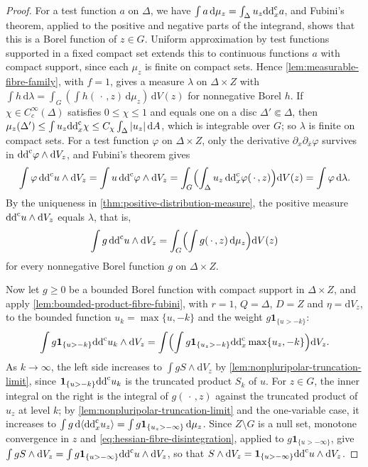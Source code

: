 \begin{proof}
For a test function $a$ on $\Delta$, we have $\int a\,\mathrm d\mu_z=\int_\Delta u_z\mathrm{dd}^{\mathrm{c}}_xa$, and Fubini's theorem, applied to the positive and negative parts of the integrand, shows that this is a Borel function of $z\in G$. Uniform approximation by test functions supported in a fixed compact set extends this to continuous functions $a$ with compact support, since each $\mu_z$ is finite on compact sets. Hence \cref{lem:measurable-fibre-family}, with $f=1$, gives a measure $\lambda$ on $\Delta\times Z$ with $\int h\,\mathrm d\lambda=\int_G(\int h(\,\cdot\,,z)\,\mathrm d\mu_z)\,\mathrm dV(z)$ for nonnegative Borel $h$. If $\chi\in C_c^\infty(\Delta)$ satisfies $0\leq\chi\leq1$ and equals one on a disc $\Delta'\Subset\Delta$, then $\mu_z(\Delta')\leq\int u_z\mathrm{dd}^{\mathrm{c}}_x\chi\leq C_\chi\int_\Delta|u_z|\,\mathrm dA$, which is integrable over $G$; so $\lambda$ is finite on compact sets. For a test function $\varphi$ on $\Delta\times Z$, only the derivative $\partial_x\partial_{\bar x}\varphi$ survives in $\mathrm{dd}^{\mathrm{c}}\varphi\wedge\mathrm dV_z$, and Fubini's theorem gives
\[
 \int\varphi\,\mathrm{dd}^{\mathrm{c}} u\wedge\mathrm dV_z=\int u\,\mathrm{dd}^{\mathrm{c}}\varphi\wedge\mathrm dV_z=\int_G\Bigl(\int_\Delta u_z\,\mathrm{dd}^{\mathrm{c}}_x\varphi(\,\cdot\,,z)\Bigr)\mathrm dV(z)=\int\varphi\,\mathrm d\lambda.
\]
By the uniqueness in \cref{thm:positive-distribution-measure}, the positive measure $\mathrm{dd}^{\mathrm{c}} u\wedge\mathrm dV_z$ equals $\lambda$, that is,
\begin{equation}\label{eq:hessian-fibre-disintegration}
 \int g\,\mathrm{dd}^{\mathrm{c}} u\wedge\mathrm dV_z=\int_G\Bigl(\int g(\,\cdot\,,z)\,\mathrm d\mu_z\Bigr)\mathrm dV(z)
\end{equation}
for every nonnegative Borel function $g$ on $\Delta\times Z$.

Now let $g\geq0$ be a bounded Borel function with compact support in $\Delta\times Z$, and apply \cref{lem:bounded-product-fibre-fubini}, with $r=1$, $Q=\Delta$, $D=Z$ and $\eta=\mathrm dV_z$, to the bounded function $u_k=\max\{u,-k\}$ and the weight $g\mathbf1_{\{u>-k\}}$:
\[
 \int g\mathbf1_{\{u>-k\}}\mathrm{dd}^{\mathrm{c}} u_k\wedge\mathrm dV_z
 =\int\Bigl(\int g\mathbf1_{\{u_z>-k\}}\mathrm{dd}^{\mathrm{c}}_x\max\{u_z,-k\}\Bigr)\mathrm dV_z.
\]
As $k\to\infty$, the left side increases to $\int gS\wedge\mathrm dV_z$ by \cref{lem:nonpluripolar-truncation-limit}, since $\mathbf1_{\{u>-k\}}\mathrm{dd}^{\mathrm{c}} u_k$ is the truncated product $S_k$ of $u$. For $z\in G$, the inner integral on the right is the integral of $g(\,\cdot\,,z)$ against the truncated product of $u_z$ at level $k$; by \cref{lem:nonpluripolar-truncation-limit} and the one-variable case, it increases to $\int g\,\mathrm d\langle\mathrm{dd}^{\mathrm{c}}_xu_z\rangle=\int g\mathbf1_{\{u_z>-\infty\}}\,\mathrm d\mu_z$. Since $Z\setminus G$ is a null set, monotone convergence in $z$ and \eqref{eq:hessian-fibre-disintegration}, applied to $g\mathbf1_{\{u>-\infty\}}$, give $\int gS\wedge\mathrm dV_z=\int g\mathbf1_{\{u>-\infty\}}\mathrm{dd}^{\mathrm{c}} u\wedge\mathrm dV_z$, so that $S\wedge\mathrm dV_z=\mathbf1_{\{u>-\infty\}}\mathrm{dd}^{\mathrm{c}} u\wedge\mathrm dV_z$.


\end{proof}
